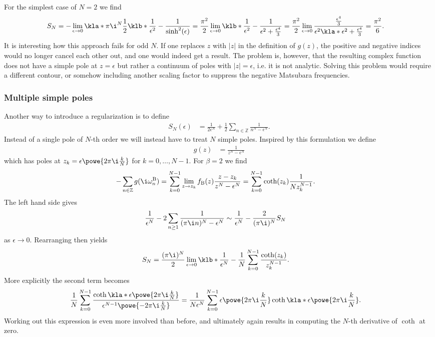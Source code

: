 \documentclass[english, parskip=full]{scrartcl}
\begin{document}
For the simplest case of $N=2$ we find
\begin{align}
S_N &= -\lim_{\epsilon \rightarrow 0} \kla*{\pi\i}^N \frac{1}{2} \klb*{ \frac{1}{\epsilon^2} -\frac{1}{\sinh^2 (\epsilon)} } = \frac{\pi^2}{2} \lim_{\epsilon\rightarrow 0} \klb*{\frac{1}{\epsilon^2} - \frac{1}{\epsilon^2 + \frac{\epsilon^4}{3}}} = \frac{\pi^2}{2} \lim_{\epsilon\rightarrow 0} \frac{\frac{\epsilon^4}{3}}{\epsilon^2 \kla*{\epsilon^2 + \frac{\epsilon^4}{3}} } = \frac{\pi^2}{6}.
\end{align}
It is interesting how this approach fails for odd $N$. 
If one replaces $z$ with $|z|$ in the definition of $g(z)$, the positive and negative indices would no longer cancel each other out, and one would indeed get a result.
The problem is, however, that the resulting complex function does not have a simple pole at $z=\epsilon$ but rather a continuum of poles with $|z|=\epsilon$, i.e. it is not analytic.
Solving this problem would require a different contour, or somehow including another scaling factor to suppress the negative Matsubara frequencies.
\subsubsection{Multiple simple poles}
Another way to introduce a regularization is to define
\begin{align}
S_N(\epsilon) &= \frac{1}{2\epsilon^N} + \frac{1}{2} \sum_{n\in\mathbb{Z}} \frac{1}{n^N - \epsilon^N}.
\end{align}
Instead of a single pole of $N$-th order we will instead have to treat $N$ simple poles.
Inspired by this formulation we define
\begin{align}
g(z) &= \frac{1}{z^N - \epsilon^N}
\end{align}
which has poles at $z_k=\epsilon \powe{2\pi\i \frac{k}{N}}$ for $k=0,\dots,N-1$.
For $\beta = 2$ we find
\begin{align}
-\sum_{n\in\mathbb{Z}} g(\i\omega_n^\text{B}) &= \sum_{k=0}^{N-1} \lim_{z\rightarrow z_k} f_\text{B}(z) \frac{z - z_k}{z^N - \epsilon^N} = \sum_{k=0}^{N-1} \coth (z_k) \frac{1}{N z_k^{N-1}}.
\end{align}
The left hand side gives
\begin{align}
\frac{1}{\epsilon^N} - 2\sum_{n\ge 1} \frac{1}{(\pi\i n)^N - \epsilon^N} &\sim \frac{1}{\epsilon^N} - \frac{2}{(\pi\i)^N} S_N
\end{align}
as $\epsilon\rightarrow 0$.
Rearranging then yields
\begin{align}
S_N &= \frac{(\pi\i)^N}{2} \lim_{\epsilon \rightarrow 0} \klb*{\frac{1}{\epsilon^N} - \frac{1}{N} \sum_{k=0}^{N-1} \frac{\coth(z_k)}{z_k^{N-1}} }.
\end{align}
More explicitly the second term becomes
\begin{align}
\frac{1}{N} \sum_{k=0}^{N-1} \frac{\coth \kla*{\epsilon \powe{2\pi\i \frac{k}{N}}} }{\epsilon^{N-1} \powe{-2\pi\i \frac{k}{N}} } &= \frac{1}{N\epsilon^N} \sum_{k=0}^{N-1} \epsilon \powe{2\pi\i \frac{k}{N}} \coth \kla*{\epsilon \powe{2\pi\i \frac{k}{N}}}.
\end{align}
Working out this expression is even more involved than before, and ultimately again results in computing the $N$-th derivative of $\coth$ at zero.
\end{document}
